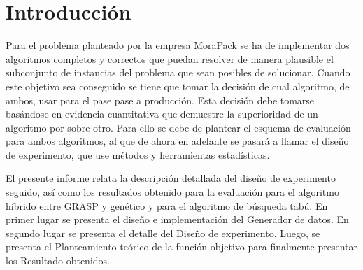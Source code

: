 \chapter{Introducción} \label{ch: general}

Para el problema planteado por la empresa MoraPack se ha de implementar dos algoritmos completos y correctos que puedan resolver de manera plausible el subconjunto de instancias del problema que sean posibles de solucionar. Cuando este objetivo sea conseguido se tiene que tomar la decisión de cual algoritmo, de ambos, usar para el pase pase a producción. Esta decisión debe tomarse basándose en evidencia cuantitativa que demuestre la superioridad de un algoritmo por sobre otro. Para ello se debe de plantear el esquema de evaluación para ambos algoritmos, al que de ahora en adelante se pasará a llamar el diseño de experimento, que use métodos y herramientas estadísticas.

El presente informe relata la descripción detallada del diseño de experimento seguido, así como los resultados obtenido para la evaluación para el algoritmo híbrido entre GRASP y genético y para el algoritmo de búsqueda tabú. En primer lugar se presenta el diseño e implementación del Generador de datos. En segundo lugar se presenta el detalle del Diseño de experimento. Luego, se presenta el Planteamiento teórico de la función objetivo para finalmente presentar los Resultado obtenidos.